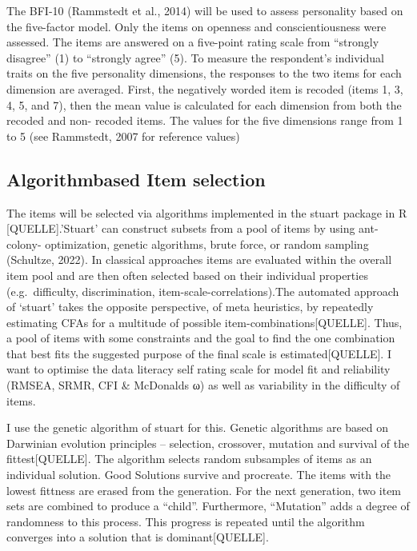 \documentclass[
  12pt,
  a4paper,
  twoside]{article}
\begin{document}
The BFI-10 (Rammstedt et al., 2014) will be used to assess
personality based on the five-factor model. Only the items on openness and
conscientiousness were assessed.
The items are answered on a five-point rating scale from ``strongly disagree'' (1) to
``strongly agree'' (5). To measure the respondent's individual traits on the five
personality dimensions, the responses to the two items for each dimension are
averaged. First, the negatively worded item is recoded (items 1, 3, 4, 5, and 7), then
the mean value is calculated for each dimension from both the recoded and non-
recoded items. The values for the five dimensions range from 1 to 5 (see
Rammstedt, 2007 for reference values)

\subsection{Algorithmbased Item selection}\label{algorithmbased-item-selection}

The items will be selected via algorithms implemented in the stuart package in R {[}QUELLE{]}.'Stuart' can construct subsets from a pool of items by using ant-colony- optimization, genetic algorithms, brute force, or random sampling (Schultze, 2022).
In classical approaches items are evaluated within the overall item pool and are then often selected based on their individual properties (e.g.~difficulty, discrimination, item-scale-correlations).The automated approach of `stuart' takes the opposite perspective, of meta heuristics, by repeatedly estimating CFAs for a multitude of possible item-combinations{[}QUELLE{]}. Thus, a pool of items with some constraints and the goal to find the one combination that best fits the suggested purpose of the final scale is estimated{[}QUELLE{]}.
I want to optimise the data literacy self rating scale for model fit and reliability (RMSEA, SRMR, CFI \& McDonalds ω) as well as variability in the difficulty of items.

I use the genetic algorithm of stuart for this. Genetic algorithms are based on Darwinian evolution principles -- selection, crossover, mutation and survival of the fittest{[}QUELLE{]}. The algorithm selects random subsamples of items as an individual solution. Good Solutions survive and procreate. The items with the lowest fittness are erased from the generation. For the next generation, two item sets are combined to produce a ``child''. Furthermore, ``Mutation'' adds a degree of randomness to this process. This progress is repeated until the algorithm converges into a solution that is dominant{[}QUELLE{]}.
\end{document}
